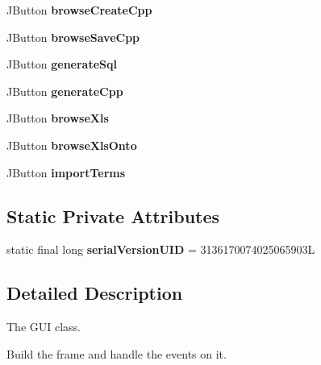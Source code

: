 \begin{DoxyCompactItemize}
\item 
\hypertarget{class_gui_a79c6d4e199f7a447f427c0633a3f02ef}{
JButton {\bfseries browseCreateCpp}}
\label{class_gui_a79c6d4e199f7a447f427c0633a3f02ef}

\item 
\hypertarget{class_gui_a513530f4cbed6c1ce699f9288eeea7f6}{
JButton {\bfseries browseSaveCpp}}
\label{class_gui_a513530f4cbed6c1ce699f9288eeea7f6}

\item 
\hypertarget{class_gui_ade0f8b5091ab64dcc6aa8f820a7b896c}{
JButton {\bfseries generateSql}}
\label{class_gui_ade0f8b5091ab64dcc6aa8f820a7b896c}

\item 
\hypertarget{class_gui_a29026ae7961f468914f48bdbe262dab5}{
JButton {\bfseries generateCpp}}
\label{class_gui_a29026ae7961f468914f48bdbe262dab5}

\item 
\hypertarget{class_gui_aee451e2d270da0598046da0377d9964f}{
JButton {\bfseries browseXls}}
\label{class_gui_aee451e2d270da0598046da0377d9964f}

\item 
\hypertarget{class_gui_a2095425bb0ce768609e992cde8ccd92f}{
JButton {\bfseries browseXlsOnto}}
\label{class_gui_a2095425bb0ce768609e992cde8ccd92f}

\item 
\hypertarget{class_gui_afb060bce39390b8a57faf5e80839dc5f}{
JButton {\bfseries importTerms}}
\label{class_gui_afb060bce39390b8a57faf5e80839dc5f}

\end{DoxyCompactItemize}
\subsection*{Static Private Attributes}
\begin{DoxyCompactItemize}
\item 
\hypertarget{class_gui_a22fc51f45d6e9af37db2f47b53d125d2}{
static final long {\bfseries serialVersionUID} = 3136170074025065903L}
\label{class_gui_a22fc51f45d6e9af37db2f47b53d125d2}

\end{DoxyCompactItemize}


\subsection{Detailed Description}
The GUI class. 

Build the frame and handle the events on it. 

